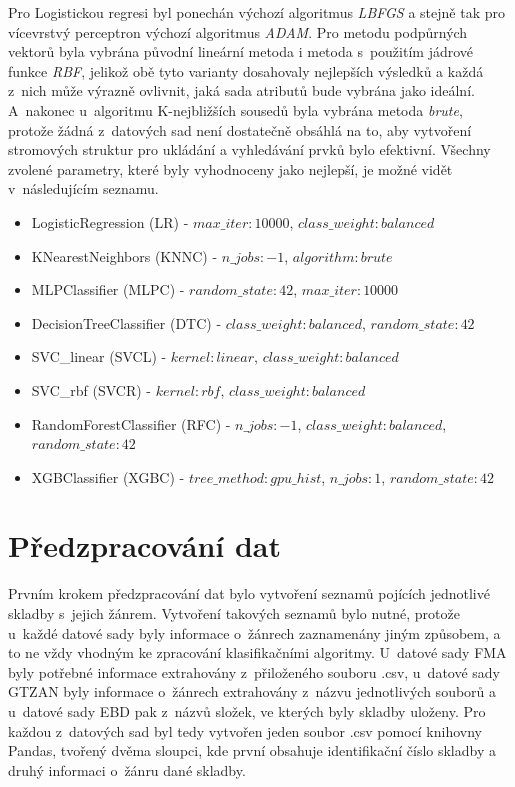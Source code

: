 Pro Logistickou regresi byl ponechán výchozí algoritmus \textit{LBFGS} a stejně tak pro vícevrstvý perceptron výchozí algoritmus \textit{ADAM}. Pro metodu podpůrných vektorů byla vybrána původní lineární metoda i metoda s~použitím jádrové funkce \textit{RBF}, jelikož obě tyto varianty dosahovaly nejlepších výsledků a každá z~nich může výrazně ovlivnit, jaká sada atributů bude vybrána jako ideální. A~nakonec u~algoritmu K-nejbližších sousedů byla vybrána metoda \textit{brute}, protože žádná z~datových sad není dostatečně obsáhlá na to, aby vytvoření stromových struktur pro ukládání a vyhledávání prvků bylo efektivní. Všechny zvolené parametry, které byly vyhodnoceny jako nejlepší, je možné vidět v~následujícím seznamu.

\begin{itemize}
    \item LogisticRegression (LR) - $max\_iter:10000$, $class\_weight:balanced$
    \item KNearestNeighbors (KNNC) - $n\_jobs:-1$, $algorithm:brute$
    \item MLPClassifier (MLPC) - $random\_state:42$, $max\_iter:10000$
    \item DecisionTreeClassifier (DTC) - $class\_weight:balanced$, $random\_state:42$
    \item SVC\_linear (SVCL) - $kernel:linear$, $class\_weight:balanced$
    \item SVC\_rbf (SVCR) - $kernel:rbf$, $class\_weight:balanced$
    \item RandomForestClassifier (RFC) - $n\_jobs:-1$, $class\_weight:balanced$, $random\_state:42$
    \item XGBClassifier (XGBC) - $tree\_method:gpu\_hist$, $n\_jobs:1$, $random\_state:42$
\end{itemize}

\section{Předzpracování dat}
\label{NIS_predzpracovani_dat_a_vyber_klasifikacnich_algoritmu}
Prvním krokem předzpracování dat bylo vytvoření seznamů pojících jednotlivé skladby s~jejich žánrem. Vytvoření takových seznamů bylo nutné, protože u~každé datové sady byly informace o~žánrech zaznamenány jiným způsobem, a to ne vždy vhodným ke zpracování klasifikačními algoritmy. U~datové sady FMA byly potřebné informace extrahovány z~přiloženého souboru .csv, u~datové sady GTZAN byly informace o~žánrech extrahovány z~názvu jednotlivých souborů a u~datové sady EBD pak z~názvů složek, ve kterých byly skladby uloženy. Pro každou z~datových sad byl tedy vytvořen jeden soubor .csv pomocí knihovny Pandas, tvořený dvěma sloupci, kde první obsahuje identifikační číslo skladby a druhý informaci o~žánru dané skladby.


